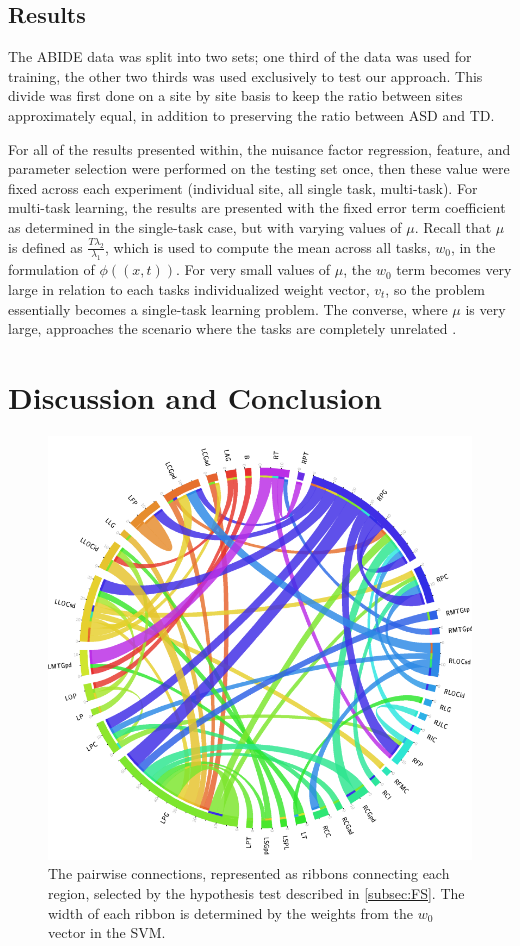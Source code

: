 \documentclass{llncs}
\begin{document}
\subsection{Results}
The ABIDE data was split into two sets; one third of the data was used for training, the other two thirds was used exclusively to test our approach.  This divide was first done on a site by site basis to keep the ratio between sites approximately equal, in addition to preserving the ratio between ASD and TD.

For all of the results presented within, the nuisance factor regression, feature, and parameter selection were performed on the testing set once, then these value were fixed across each experiment (individual site, all single task, multi-task).  For multi-task learning, the results are presented with the fixed error term coefficient as determined in the single-task case, but with varying values of $\mu$.  Recall that $\mu$ is defined as $\frac{T\lambda_2}{\lambda_1}$, which is used to compute the mean across all tasks, $w_0$, in the formulation of $\phi((x,t))$. For very small values of $\mu$, the $w_0$ term becomes very large in relation to each tasks individualized weight vector, $v_t$, so the problem essentially becomes a single-task learning problem.  The converse, where $\mu$ is very large, approaches the scenario where the tasks are completely unrelated \cite{regMTL}.
\section{Discussion and Conclusion}
\begin{figure}
	\centering
	\includegraphics[scale = .3]{now_circos.png}
	\caption{The pairwise connections, represented as ribbons connecting each region, selected by the hypothesis test described in \ref{subsec:FS}.  The width of each ribbon is determined by the weights from the $w_0$ vector in the SVM. }
	\label{fig:circos}
\end{figure}
\end{document}
